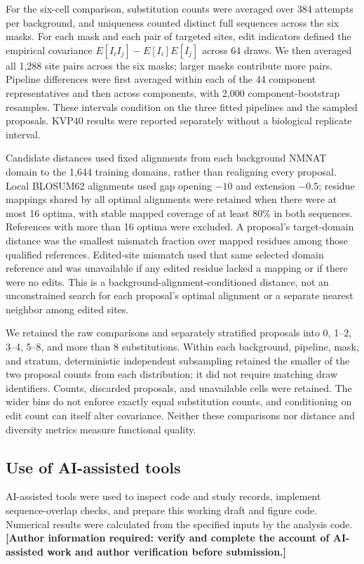 \documentclass[referee,pdflatex,sn-vancouver-num]{sn-jnl}
\newcommand{\pending}[1]{\textbf{[Author information required: #1]}}
\begin{document}
For the six-cell comparison, substitution counts were averaged over 384 attempts per background, and uniqueness counted distinct full sequences across the six masks. For each mask and each pair of targeted sites, edit indicators defined the empirical covariance $E[I_i I_j]-E[I_i]E[I_j]$ across 64 draws. We then averaged all 1,288 site pairs across the six masks; larger masks contribute more pairs. Pipeline differences were first averaged within each of the 44 component representatives and then across components, with 2,000 component-bootstrap resamples. These intervals condition on the three fitted pipelines and the sampled proposals. KVP40 results were reported separately without a biological replicate interval.

Candidate distances used fixed alignments from each background NMNAT domain to the 1,644 training domains, rather than realigning every proposal. Local BLOSUM62 alignments used gap opening $-10$ and extension $-0.5$; residue mappings shared by all optimal alignments were retained when there were at most 16 optima, with stable mapped coverage of at least 80\% in both sequences. References with more than 16 optima were excluded. A proposal's target-domain distance was the smallest mismatch fraction over mapped residues among those qualified references. Edited-site mismatch used that same selected domain reference and was unavailable if any edited residue lacked a mapping or if there were no edits. This is a background-alignment-conditioned distance, not an unconstrained search for each proposal's optimal alignment or a separate nearest neighbor among edited sites.

We retained the raw comparisons and separately stratified proposals into 0, 1--2, 3--4, 5--8, and more than 8 substitutions. Within each background, pipeline, mask, and stratum, deterministic independent subsampling retained the smaller of the two proposal counts from each distribution; it did not require matching draw identifiers. Counts, discarded proposals, and unavailable cells were retained. The wider bins do not enforce exactly equal substitution counts, and conditioning on edit count can itself alter covariance. Neither these comparisons nor distance and diversity metrics measure functional quality.

\subsection{Use of AI-assisted tools}
AI-assisted tools were used to inspect code and study records, implement sequence-overlap checks, and prepare this working draft and figure code. Numerical results were calculated from the specified inputs by the analysis code. \pending{verify and complete the account of AI-assisted work and author verification before submission.}
\end{document}
